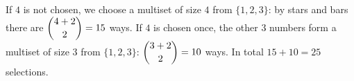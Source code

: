 If $4$ is not chosen, we choose a multiset of size $4$ from $\{1,2,3\}$: by stars and bars there are $\dbinom{4+2}{2}=15$ ways. If $4$ is chosen once, the other $3$ numbers form a multiset of size $3$ from $\{1,2,3\}$: $\dbinom{3+2}{2}=10$ ways. In total $15+10=\boxed{25}$ selections.
